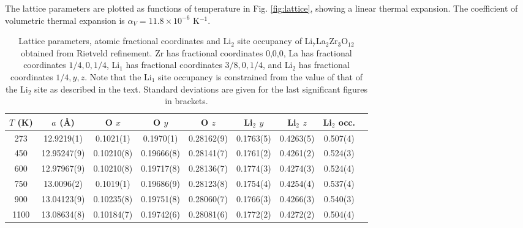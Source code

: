 \documentclass[twoside,twocolumn,9pt]{article}
\begin{document}
The lattice parameters are plotted as functions of temperature in Fig. \ref{fig:lattice}, showing a linear thermal expansion. The coefficient of volumetric thermal expansion is $\alpha_V = 11.8 \times 10^{-6}$ K$^{-1}$.

\begin{table}[t]
\centering
\caption{Lattice parameters, atomic fractional coordinates and Li$_2$ site occupancy of Li$_7$La$_2$Zr$_3$O$_{12}$ obtained from Rietveld refinement. Zr has fractional coordinates 0,0,0, La has fractional coordinates $1/4,0,1/4$, Li$_1$ has fractional coordinates $3/8,0,1/4$, and Li$_2$ has fractional coordinates $1/4,y,z$. Note that the Li$_1$ site occupancy is constrained from the value of that of the Li$_2$ site as described in the text. Standard deviations are given for the last significant figures in brackets. }
\label{tab:Rietveld_structure}
\begin{tabular}{ccccccccc}
\hline
\hline
$T$ (K)  & $a$ (\AA) & O $x$        & O $y$        & O $z$        &  Li$_2$ $y$       & Li$_2$ $z$ & Li$_2$ occ. \\
\hline
273  & 12.9219(1)    & 0.1021(1)      & 0.1970(1)      & 0.28162(9)     & 0.1763(5)           & 0.4263(5)    & 0.507(4) \\
450  & 12.95247(9)   & 0.10210(8)     & 0.19666(8)     & 0.28141(7)     & 0.1761(2)           & 0.4261(2)    & 0.524(3) \\
600  & 12.97967(9)   & 0.10210(8)     & 0.19717(8)     & 0.28136(7)     & 0.1774(3)           & 0.4274(3)    & 0.524(4) \\
750  & 13.0096(2)    & 0.1019(1)      & 0.19686(9)     & 0.28123(8)     & 0.1754(4)           & 0.4254(4)    & 0.537(4) \\
900  & 13.04123(9)   & 0.10235(8)     & 0.19751(8)     & 0.28060(7)     & 0.1766(3)           & 0.4266(3)    & 0.540(3) \\
1100 & 13.08634(8)   & 0.10184(7)     & 0.19742(6)     & 0.28081(6)     & 0.1772(2)           & 0.4272(2)    & 0.504(4) \\
\hline
\hline
\end{tabular}
\end{table}
\end{document}
